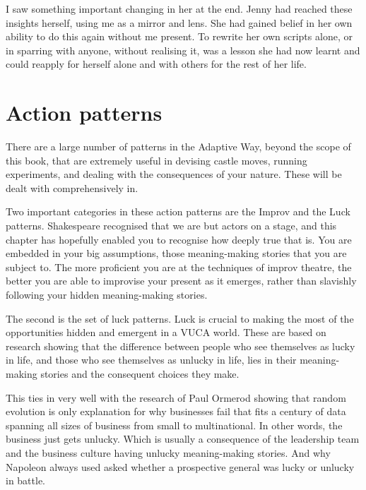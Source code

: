 \begin{longstoryblock}
I saw something important changing in her at the end. Jenny had reached these insights herself, using me as a mirror and lens. She had gained belief in her own ability to do this again without me present. To rewrite her own scripts alone, or in sparring with anyone, without realising it, was a lesson she had now learnt and could reapply for herself alone and with others for the rest of her life.
\end{longstoryblock}






\section{Action patterns}
There are a large number of patterns in the Adaptive Way, beyond the scope of this book, that are extremely useful in devising castle moves, running experiments, and dealing with the consequences of your nature. These will be dealt with comprehensively in\cite{boyd-regenerate}.


Two important categories in these action patterns are the Improv and the Luck patterns. Shakespeare recognised that we are but actors on a stage, and this chapter has hopefully enabled you to recognise how deeply true that is. You are embedded in your big assumptions, those meaning-making stories that you are subject to. The more proficient you are at the techniques of improv theatre, the better you are able to improvise your present as it emerges, rather than slavishly following your hidden meaning-making stories. 


The second is the set of luck patterns. Luck is crucial to making the most of the opportunities hidden and emergent in a VUCA world.  These are based on research showing that the difference between people who see themselves as lucky in life, and those who see themselves as unlucky in life, lies in their meaning-making stories and the consequent choices they make\cite{wiseman-luck}. 


This ties in very well with the research of Paul Ormerod\cite{ormerod-why-fail} showing that random evolution is only explanation for why businesses fail that fits a century of data spanning all sizes of business from small to multinational. In other words, the business just gets unlucky. Which is usually a consequence of the leadership team and the business culture having unlucky meaning-making stories. And why Napoleon always used asked whether a prospective general was lucky or unlucky in battle.




